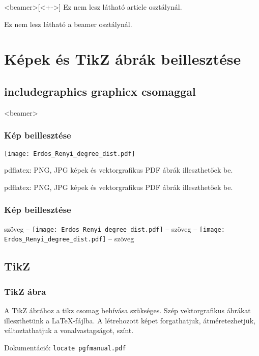 \documentclass[ignorenonframetext]{beamer}
\begin{document}
\begin{frame}<beamer>[<+->]
  Ez nem lesz látható article osztálynál.
\end{frame}

Ez nem lesz látható a beamer osztálynál.



\section[Ábrák]{Képek és TikZ ábrák beillesztése}
\subsection{includegraphics graphicx csomaggal}

\begin{frame}<beamer>
  \frametitle{Kép beillesztése}
  \texttt{[image: Erdos\_Renyi\_degree\_dist.pdf]}

 pdflatex: PNG, JPG képek és vektorgrafikus PDF ábrák illeszthetőek be.
\end{frame}

 pdflatex: PNG, JPG képek és vektorgrafikus PDF ábrák illeszthetőek be.

\begin{frame}
  \frametitle{Kép beillesztése}
   szöveg -- 
  \texttt{[image: Erdos\_Renyi\_degree\_dist.pdf]}
   -- szöveg -- 
  \texttt{[image: Erdos\_Renyi\_degree\_dist.pdf]}
   -- szöveg
\end{frame}


\subsection{TikZ}

\begin{frame}[fragile]
  \frametitle{TikZ ábra}

A TikZ ábrához a tikz csomag behívása szükséges. Szép vektorgrafikus
ábrákat illeszthetünk a \LaTeX-fájlba. A létrehozott képet
forgathatjuk, átméretezhetjük, változtathatjuk a vonalvastagságot,
színt.

Dokumentáció: \verb|locate pgfmanual.pdf|


\end{frame}
\end{document}
